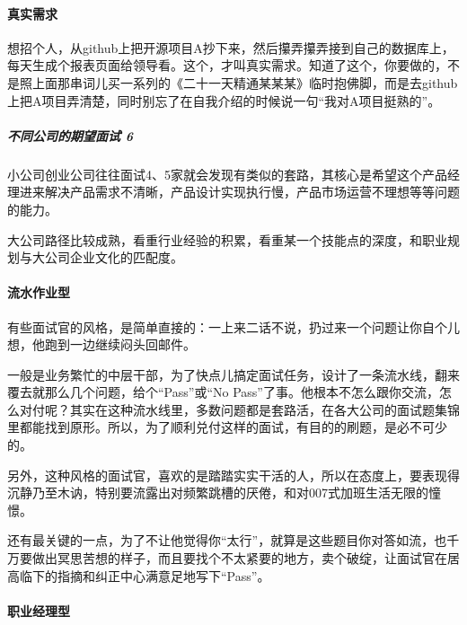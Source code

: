 \documentclass[letterpaper,11pt,english]{sphinxmanual}
\begin{document}
\paragraph{真实需求}
\label{\detokenize{chapter_interview/interviewer:id3}}
想招个人，从github上把开源项目A抄下来，然后攥弄攥弄接到自己的数据库上，每天生成个报表页面给领导看。这个，才叫真实需求。知道了这个，你要做的，不是照上面那串词儿买一系列的《二十一天精通某某某》临时抱佛脚，而是去github上把A项目弄清楚，同时别忘了在自我介绍的时候说一句“我对A项目挺熟的”。


\subparagraph{不同公司的期望面试 6\sphinxfootnotemark[772]}
\label{\detokenize{chapter_interview/interviewer:id4}}%
\begin{footnotetext}[772]\sphinxAtStartFootnote
{}
%
\end{footnotetext}\ignorespaces 
小公司创业公司往往面试4、5家就会发现有类似的套路，其核心是希望这个产品经理进来解决产品需求不清晰，产品设计实现执行慢，产品市场运营不理想等等问题的能力。

大公司路径比较成熟，看重行业经验的积累，看重某一个技能点的深度，和职业规划与大公司企业文化的匹配度。


\paragraph{流水作业型}
\label{\detokenize{chapter_interview/interviewer:id5}}
有些面试官的风格，是简单直接的：一上来二话不说，扔过来一个问题让你自个儿想，他跑到一边继续闷头回邮件。

一般是业务繁忙的中层干部，为了快点儿搞定面试任务，设计了一条流水线，翻来覆去就那么几个问题，给个“Pass”或“No
Pass”了事。他根本不怎么跟你交流，怎么对付呢？其实在这种流水线里，多数问题都是套路活，在各大公司的面试题集锦里都能找到原形。所以，为了顺利兑付这样的面试，有目的的刷题，是必不可少的。

另外，这种风格的面试官，喜欢的是踏踏实实干活的人，所以在态度上，要表现得沉静乃至木讷，特别要流露出对频繁跳槽的厌倦，和对007式加班生活无限的憧憬。

还有最关键的一点，为了不让他觉得你“太行”，就算是这些题目你对答如流，也千万要做出冥思苦想的样子，而且要找个不太紧要的地方，卖个破绽，让面试官在居高临下的指摘和纠正中心满意足地写下“Pass”。


\paragraph{职业经理型}
\label{\detokenize{chapter_interview/interviewer:id6}}
\end{document}
